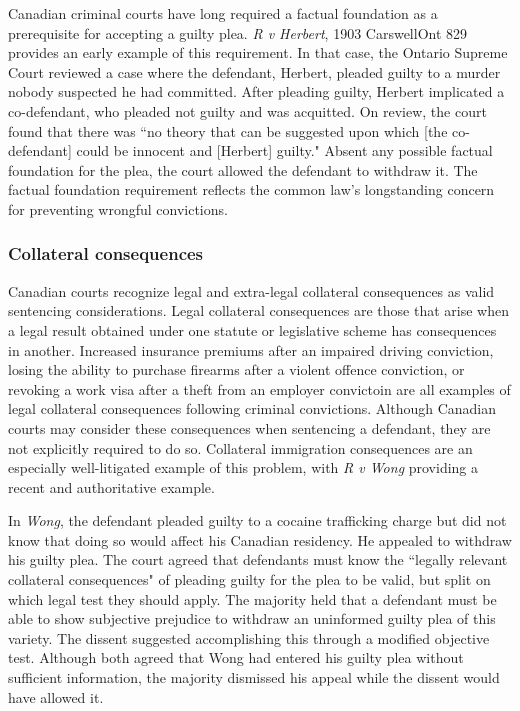 Canadian criminal courts have long required a factual foundation as a prerequisite for accepting a guilty plea. \textit{R v Herbert}, 1903 CarswellOnt 829 provides an early example of this requirement. In that case, the Ontario Supreme Court reviewed a case where the defendant, Herbert, pleaded guilty to a murder nobody suspected he had committed. After pleading guilty, Herbert implicated a co-defendant, who pleaded not guilty and was acquitted. On review, the court found that there was ``no theory that can be suggested upon which [the co-defendant] could be innocent and [Herbert] guilty." Absent any possible factual foundation for the plea, the court allowed the defendant to withdraw it. The factual foundation requirement reflects the common law's longstanding concern for preventing wrongful convictions.

\subsubsection{Collateral consequences}

Canadian courts recognize legal and extra-legal collateral consequences as valid sentencing considerations. Legal collateral consequences are those that arise when a legal result obtained under one statute or legislative scheme has consequences in another. Increased insurance premiums after an impaired driving conviction, losing the ability to purchase firearms after a violent offence conviction, or revoking a work visa after a theft from an employer convictoin are all examples of legal collateral consequences following criminal convictions. Although Canadian courts may consider these consequences when sentencing a defendant, they are not explicitly required to do so. Collateral immigration consequences are an especially well-litigated example of this problem, with \textit{R v Wong} providing a recent and authoritative example. 

In \textit{Wong}, the defendant pleaded guilty to a cocaine trafficking charge but did not know that doing so would affect his Canadian residency. He appealed to withdraw his guilty plea. The court agreed that defendants must know the ``legally relevant collateral consequences" of pleading guilty for the plea to be valid, but split on which legal test they should apply. The majority held that a defendant must be able to show subjective prejudice to withdraw an uninformed guilty plea of this variety. The dissent suggested accomplishing this through a modified objective test. Although both agreed that Wong had entered his guilty plea without sufficient information, the majority dismissed his appeal while the dissent would have allowed it.

